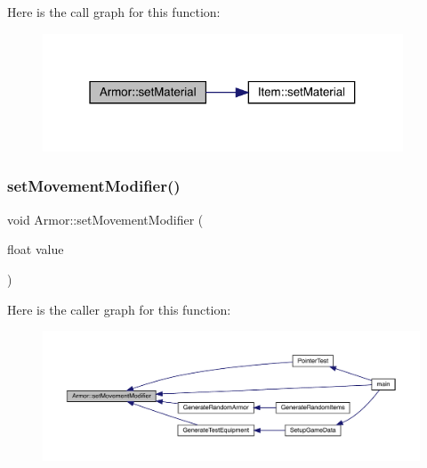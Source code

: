 Here is the call graph for this function\+:
\nopagebreak
\begin{figure}[H]
\begin{center}
\leavevmode
\includegraphics[width=304pt]{d9/d76/class_armor_a1710521cbba1bf9328e969cbbc8cdbf3_cgraph}
\end{center}
\end{figure}
\mbox{\label{class_armor_a99475fc688add41f89b7fef160534e33}} 
\subsubsection{\texorpdfstring{set\+Movement\+Modifier()}{setMovementModifier()}}
{\footnotesize\ttfamily void Armor\+::set\+Movement\+Modifier (\begin{DoxyParamCaption}\item[{float}]{value }\end{DoxyParamCaption})}

Here is the caller graph for this function\+:
\nopagebreak
\begin{figure}[H]
\begin{center}
\leavevmode
\includegraphics[width=350pt]{d9/d76/class_armor_a99475fc688add41f89b7fef160534e33_icgraph}
\end{center}
\end{figure}
\mbox{\label{class_armor_a4fe1507d7aaf280a18e19f51a6f8c42d}} 
